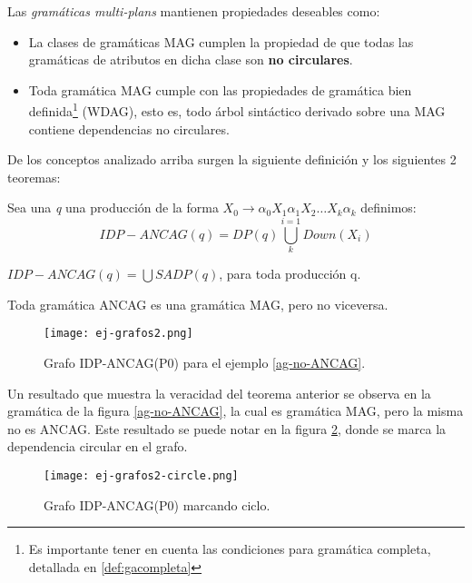 Las \textit{gramáticas multi-plans} mantienen propiedades deseables como:
\begin{itemize}
\item La clases de gramáticas MAG cumplen la propiedad de que todas las gramáticas de atributos en dicha clase son \textbf{no circulares}.
\item Toda gramática MAG cumple con las propiedades de gramática bien definida\footnote{Es importante tener en cuenta las condiciones para gramática completa, detallada en \ref{def:gacompleta}} (WDAG), esto es, todo árbol sintáctico derivado sobre una MAG contiene dependencias no circulares.
\end{itemize}


De los conceptos analizado arriba surgen la siguiente definición y los siguientes 2 teoremas:

\begin{definition}
\label{def:ancag}
 Sea una \textit{q} una producción de la forma $X_{0}\rightarrow \alpha_{0} X_{1} \alpha_{1} X_{2} \dots X_{k} \alpha_{k}$ definimos:
\begin{equation}
 IDP-ANCAG(q) = DP(q) \bigcup\limits_{k}^{i=1}{Down(X_{i})}
\end{equation}

\end{definition}

\begin{theorem}
\label{th:ancag1}
$IDP-ANCAG(q) = \bigcup SADP(q)$, para toda producción q. 
\end{theorem}

\begin{theorem}
\label{th:ancag2}
Toda gramática ANCAG es una gramática MAG, pero no viceversa.
\end{theorem}

\begin{figure}\centering
\texttt{[image: ej-grafos2.png]}
\caption{\label{idp-wuu-yang}Grafo IDP-ANCAG(P0) para el ejemplo \ref{ag-no-ANCAG}.}
\end{figure}

Un resultado que muestra la veracidad del teorema anterior se observa en la gramática de la figura \ref{ag-no-ANCAG}, la cual es gramática MAG, pero la misma no es ANCAG. Este resultado se puede notar en la figura \ref{ancag-circle}, donde se marca la dependencia circular en el grafo.

\begin{figure}[t!]\centering
\texttt{[image: ej-grafos2-circle.png]}
\caption{\label{ancag-circle} Grafo IDP-ANCAG(P0) marcando ciclo.}
\end{figure}
